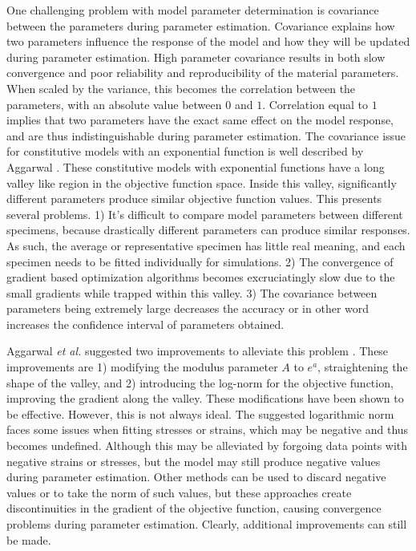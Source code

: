 	One challenging problem with model parameter determination is covariance between the parameters during parameter estimation. Covariance explains how two parameters influence the response of the model and how they will be updated during parameter estimation. High parameter covariance results in both slow convergence and poor reliability and reproducibility of the material parameters. When scaled by the variance, this becomes the correlation between the parameters, with an absolute value between $0$ and $1$. Correlation equal to $1$ implies that two parameters have the exact same effect on the model response, and are thus indistinguishable during parameter estimation. The covariance issue for constitutive models with an exponential function is well described by Aggarwal \cite{aggarwal_inverse_2015, aggarwal_improved_2017}. These constitutive models with exponential functions have a long valley like region in the objective function space. Inside this valley, significantly different parameters produce similar objective function values. This presents several problems. 1) It's difficult to compare model parameters between different specimens, because drastically different parameters can produce similar responses. As such, the average or representative specimen has little real meaning, and each specimen needs to be fitted individually for simulations. 2) The convergence of gradient based optimization algorithms becomes excruciatingly slow due to the small gradients while trapped within this valley. 3) The covariance between parameters being extremely large decreases the accuracy or in other word increases the confidence interval of parameters obtained. 
    
    Aggarwal \textit{et al.} suggested two improvements to alleviate this problem \cite{aggarwal_improved_2017}. These improvements are 1) modifying the modulus parameter $A$ to $e^{a}$, straightening the shape of the valley, and 2) introducing the log-norm for the objective function, improving the gradient along the valley. These modifications have been shown to be effective. However, this is not always ideal. The suggested logarithmic norm faces some issues when fitting stresses or strains, which may be negative and thus becomes undefined. Although this may be alleviated by forgoing data points with negative strains or stresses, but the model may still produce negative values during parameter estimation. Other methods can be used to discard negative values or to take the norm of such values, but these approaches create discontinuities in the gradient of the objective function, causing convergence problems during parameter estimation. Clearly, additional improvements can still be made. 


